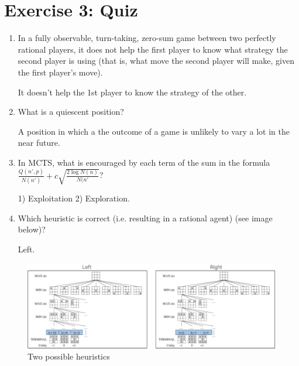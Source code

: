 \documentclass[9pt,a4paper]{extarticle}
\newenvironment{solution}
    {%
    \color{red}
    }
    { 
    \color{black}
    }
\begin{document}
\section*{Exercise 3: Quiz}
   \begin{enumerate}
       \item In a fully observable, turn-taking, zero-sum game between two perfectly rational players, it does not help the first player to know what strategy the second player is using (that is, what move the second player will make, given the first player’s move).
       \begin{solution}
       It doesn't help the 1st player to know the strategy of the other.
       \end{solution}
       \item What is a quiescent position?
       \begin{solution}
       A position in which a the outcome of a game is unlikely to vary a lot in the near future.
       \end{solution}
       \item In MCTS, what is encouraged by each term of the sum in the formula $\frac{Q(n', p)}{N(n')} + c\sqrt{\frac{2\log N(n)}{N(n'}}$?
       \begin{solution}
       1) Exploitation 2) Exploration.
       \end{solution}
       \item Which heuristic is correct (i.e. resulting in a rational agent) (see image below)?
       \begin{solution}
       Left.
       \end{solution}
   \end{enumerate}
   \begin{figure}[H]
       \centering
       \includegraphics[width=1.\textwidth]{figures/trees.pdf}
       \caption{Two possible heuristics}
       \label{fig:my_label}
   \end{figure}
\end{document}
